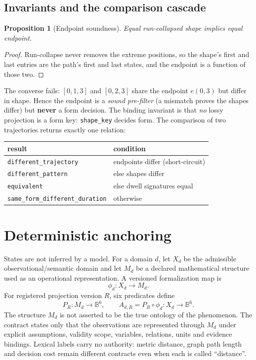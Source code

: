 \documentclass[11pt,a4paper]{article}
\newtheorem{proposition}{Proposition}
\begin{document}
\subsection{Invariants and the comparison cascade}
\begin{proposition}[Endpoint soundness]
Equal run-collapsed shape implies equal endpoint.
\end{proposition}
\begin{proof}
Run-collapse never removes the extreme positions, so the shape's first and last
entries are the path's first and last states, and the endpoint is a function of
those two. \end{proof}
The converse fails: $[0,1,3]$ and $[0,2,3]$ share the endpoint $e(0,3)$ but differ
in shape. Hence the endpoint is a \emph{sound pre-filter} (a mismatch proves the
shapes differ) but \textbf{never} a form decision. The binding invariant is that
\emph{no} lossy projection is a form key: \texttt{shape\_key} decides form. The
comparison of two trajectories returns exactly one relation:
\begin{center}
\begin{tabular}{ll}
\toprule
result & condition \\
\midrule
\texttt{different\_trajectory} & endpoints differ (short-circuit) \\
\texttt{different\_pattern} & else shapes differ \\
\texttt{equivalent} & else dwell signatures equal \\
\texttt{same\_form\_different\_duration} & otherwise \\
\bottomrule
\end{tabular}
\end{center}

\section{Deterministic anchoring}
States are not inferred by a model. For a domain $d$, let $X_d$ be the admissible
observational/semantic domain and let $M_d$ be a declared mathematical structure
used as an operational representation. A versioned formalization map is
\begin{equation}
\phi_d:X_d\to M_d.
\end{equation}
For registered projection version $R$, six predicates define
\begin{equation}
P_R:M_d\to\mathbb{B}^6,
\qquad
A_{d,R}=P_R\circ\phi_d:X_d\to\mathbb{B}^6.
\end{equation}
The structure $M_d$ is not asserted to be the true ontology of the phenomenon.
The contract states only that the observations are represented through $M_d$
under explicit assumptions, validity scope, variables, relations, units and
evidence bindings. Lexical labels carry no authority: metric distance, graph path
length and decision cost remain different contracts even when each is called
``distance''.
\end{document}
